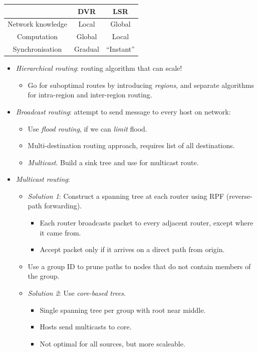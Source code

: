 \documentclass[twocolumn,english]{article}
\providecommand{\tabularnewline}{\\}
\providecommand{\tabularnewline}{\\}
\begin{document}
\begin{table}[H]
\centering{}%
\begin{tabular}{ccc}
\toprule 
 & \textbf{DVR} & \textbf{LSR}\tabularnewline
\midrule
Network knowledge & Local & Global\tabularnewline
Computation & Global & Local\tabularnewline
Synchronisation & Gradual & ``Instant''\tabularnewline
\bottomrule
\end{tabular}
\end{table}
\begin{itemize}
\item \emph{Hierarchical routing}: routing algorithm that can scale!
\begin{itemize}
\item Go for suboptimal routes by introducing \emph{regions}, and separate
algorithms for intra-region and inter-region routing.
\end{itemize}
\item \emph{Broadcast routing}: attempt to send message to every host on
network:
\begin{itemize}
\item Use \emph{flood routing}, if we can \emph{limit} flood.
\item Multi-destination routing approach, requires list of all destinations.
\item \emph{Multicast}. Build a sink tree and use for multicast route.
\end{itemize}
\item \emph{Multicast routing}:
\begin{itemize}
\item \emph{Solution 1}: Construct a spanning tree at each router using
RPF (reverse-path forwarding).
\begin{itemize}
\item Each router broadcasts packet to every adjacent router, except where
it came from.
\item Accept packet only if it arrives on a direct path from origin.
\end{itemize}
\item Use a group ID to prune paths to nodes that do not contain members
of the group.
\item \emph{Solution 2}: Use \emph{core-based trees}.
\begin{itemize}
\item Single spanning tree per group with root near middle.
\item Hosts send multicasts to core.
\item Not optimal for all sources, but more scaleable.
\end{itemize}
\end{itemize}
\end{itemize}
\end{document}
